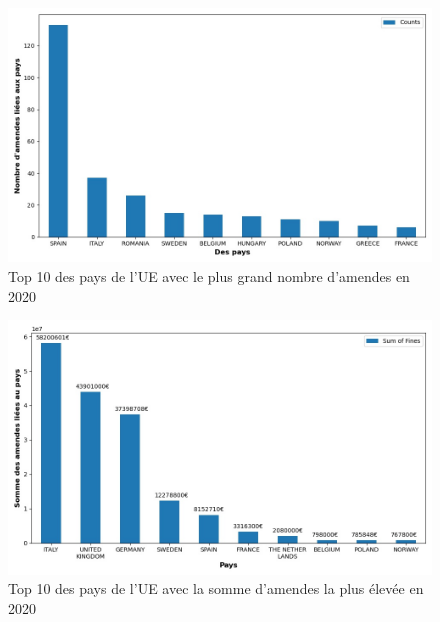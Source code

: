 \documentclass[french]{article}
\begin{document}
	\begin{figure}
		[H]\centering\includegraphics[scale=.5]{graphs/top10_countries_year}
		\caption{Top 10 des pays de l'UE avec le plus grand nombre d'amendes en 2020}
	\end{figure}
	\begin{figure}
		[H]\centering\includegraphics[scale=.5]{graphs/top10_countries_year_fines}
		\caption{Top 10 des pays de l'UE avec la somme d'amendes la plus élevée en 2020}
	\end{figure}
\end{document}
